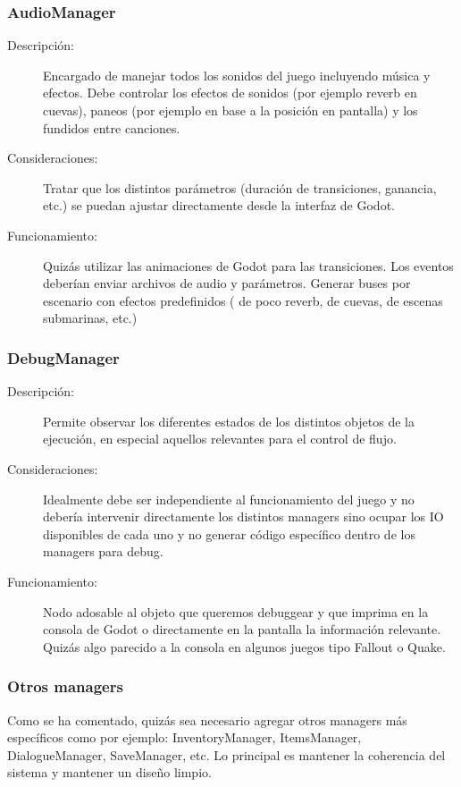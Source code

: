 \subsubsection{AudioManager}\label{modelado:audiomanager}
\begin{description}
	\item[Descripción:] Encargado de manejar todos los sonidos del juego incluyendo música y efectos. Debe controlar los efectos de sonidos (por ejemplo reverb en cuevas), paneos (por ejemplo en base a la posición en pantalla) y los fundidos entre canciones.
	
	\item[Consideraciones:] Tratar que los distintos parámetros (duración de transiciones, ganancia, etc.) se puedan ajustar directamente desde la interfaz de Godot.
	
	\item[Funcionamiento:] Quizás utilizar las animaciones de Godot para las transiciones. Los eventos deberían enviar archivos de audio y parámetros. Generar buses por escenario con efectos predefinidos ( de poco reverb,  de cuevas,  de escenas submarinas, etc.)
\end{description}
	
\subsubsection{DebugManager}\label{modelado:debugmanager}
\begin{description}
	\item[Descripción:] Permite observar los diferentes estados de los distintos objetos de la ejecución, en especial aquellos relevantes para el control de flujo.
	
	\item[Consideraciones:] Idealmente debe ser independiente al funcionamiento del juego y no debería intervenir directamente los distintos managers sino ocupar los IO disponibles de cada uno y no generar código específico dentro de los managers para debug.
	
	\item[Funcionamiento:] Nodo adosable al objeto que queremos debuggear y que imprima en la consola de Godot o directamente en la pantalla la información relevante. Quizás algo parecido a la consola en algunos juegos tipo Fallout o Quake.
\end{description}

\subsubsection{Otros managers}\label{modelado:otros-managers}
Como se ha comentado, quizás sea necesario agregar otros managers más específicos como por ejemplo: InventoryManager, ItemsManager, DialogueManager, SaveManager, etc. Lo principal es mantener la coherencia del sistema y mantener un diseño limpio.

